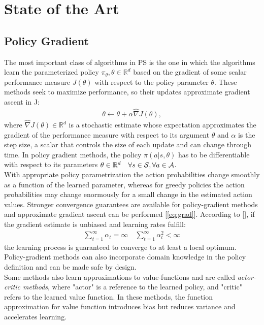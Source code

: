 \chapter{State of the Art} \label{chap:state}

\section{Policy Gradient}
The most important class of algorithms in \ac{PS} is the one in which the algorithms learn the parameterized policy $\pi_{\theta}, \theta \in \mathbb{R}^d$ based on the gradient of some scalar performance measure $J(\theta)$ with respect to the policy parameter $\theta$. These methods seek to maximize performance, so their updates approximate gradient ascent in J:
\begin{align}
\theta \leftarrow \theta + \alpha \widehat{\nabla}J(\theta), \label{eq:grad}
\end{align}
where $\widehat{\nabla}J(\theta) \in \mathbb{R}^d$ is a stochastic estimate whose expectation approximates the gradient of the performance measure with respect to its argument $\theta$ and $\alpha$ is the step size, a scalar that controls the size of each update and can change through time. In policy gradient methods, the policy $\pi(a|s,\theta)$ has to be differentiable with respect to its parameters $\theta \in \mathbb{R}^d \quad \forall s \in \mathcal{S}, \forall a \in \mathcal{A}$.\\
\newline
With appropriate policy parametrization the action probabilities change smoothly as a function of the learned parameter, whereas for greedy policies the action probabilities may change enormously for a small change in the estimated action values. Stronger convergence guarantees are available for policy-gradient methods and approximate gradient ascent can be performed [\ref{eq:grad}]. According to [\cite{Peters2008ReinforcementLO}], if the gradient estimate is unbiased and learning rates fulfill:
\begin{align}\sum_{t=1}^{\infty}\alpha_t = \infty \quad \sum_{t=1}^{\infty}\alpha_t^2 < \infty\end{align} 
the learning process is guaranteed to converge to at least a local optimum. Policy-gradient methods can also incorporate domain knowledge in the policy definition and can be made safe by design.\\
\newline
Some methods also learn approximations to value-functions and are called \emph{actor-critic methods}, where "actor" is a reference to the learned policy, and "critic" refers to the learned value function. In these methods, the function approximation for value function introduces bias but reduces variance and accelerates learning.

